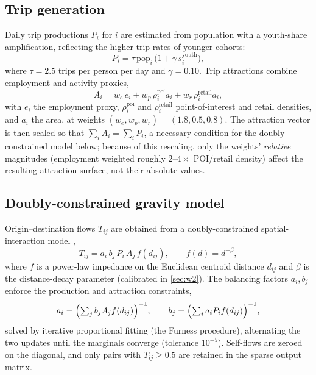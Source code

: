 \subsection{Trip generation}
Daily trip productions $P_i$ for \ageb $i$ are estimated from population with a
youth-share amplification, reflecting the higher trip rates of younger cohorts:
\begin{equation}
  P_i = \tau \, \mathrm{pop}_i \,\bigl(1 + \gamma\, s^{\text{youth}}_i\bigr),
  \label{eq:productions}
\end{equation}
where $\tau = \num{2.5}$ trips per person per day and $\gamma = \num{0.10}$. Trip
attractions combine employment and activity proxies,
\begin{equation}
  A_i = w_e\, e_i + w_p\, \rho^{\text{poi}}_i a_i + w_r\, \rho^{\text{retail}}_i a_i,
  \label{eq:attractions}
\end{equation}
with $e_i$ the employment proxy, $\rho^{\text{poi}}_i$ and $\rho^{\text{retail}}_i$
point-of-interest and retail densities, and $a_i$ the \ageb area, at weights
$(w_e, w_p, w_r) = (\num{1.8}, \num{0.5}, \num{0.8})$. The attraction
vector is then scaled so that $\sum_i A_i = \sum_i P_i$, a necessary condition for
the doubly-constrained model below; because of this rescaling, only the weights'
\emph{relative} magnitudes (employment weighted roughly $2$--$4\times$ POI/retail
density) affect the resulting attraction surface, not their absolute values.

\subsection{Doubly-constrained gravity model}
Origin--destination flows $T_{ij}$ are obtained from a doubly-constrained
spatial-interaction model \parencite{wilson1971gravity},
\begin{equation}
  T_{ij} = a_i\, b_j\, P_i\, A_j\, f(d_{ij}), \qquad
  f(d) = d^{-\beta},
  \label{eq:gravity}
\end{equation}
where $f$ is a power-law impedance on the Euclidean centroid distance $d_{ij}$ and
$\beta$ is the distance-decay parameter (calibrated in \cref{sec:w2}). The
balancing factors $a_i,b_j$ enforce the production and attraction constraints,
\begin{equation}
  a_i = \Bigl(\textstyle\sum_j b_j A_j f(d_{ij})\Bigr)^{-1}, \qquad
  b_j = \Bigl(\textstyle\sum_i a_i P_i f(d_{ij})\Bigr)^{-1},
  \label{eq:furness}
\end{equation}
solved by iterative proportional fitting (the Furness procedure), alternating the
two updates until the marginals converge (tolerance $10^{-5}$). Self-flows are
zeroed on the diagonal, and only pairs with $T_{ij}\ge\num{0.5}$ are retained in
the sparse output matrix.

